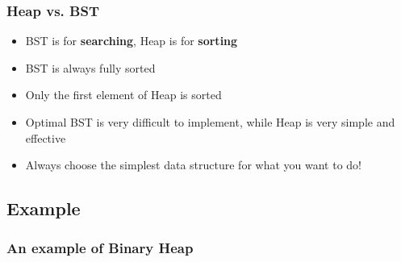\documentclass[10pt,svgnames,usenames,table]{beamer} %
\begin{document}
\begin{frame}
  \frametitle{Heap vs. BST}
  \begin{itemize}
  	\item BST is for \textbf{searching}, Heap is for \textbf{sorting}
  	\item BST is always fully sorted
  	\item Only the first element of Heap is sorted
  	\item Optimal BST is very difficult to implement, while Heap is very simple and effective
  	\item Always choose the simplest data structure for what you want to do!
  \end{itemize}
\end{frame}

\subsection{Example}
\begin{frame}
  \frametitle{An example of Binary Heap}
  \begin{center}
  \end{center}
\end{frame}
\end{document}
